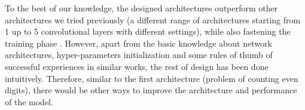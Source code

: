 To the best of our knowledge, the designed architectures outperform other architectures we tried previously (a different range of architectures starting from 1 up to 5 convolutional layers with different settings), while also fastening the training phase . However, apart from the basic knowledge about network architectures, hyper-parameters initialization and some rules of thumb of successful experiences in similar works, the rest of design has been done intuitively. Therefore, similar to the first architecture (problem of counting even digits), there would be other ways to improve the architecture and performance of the model.


